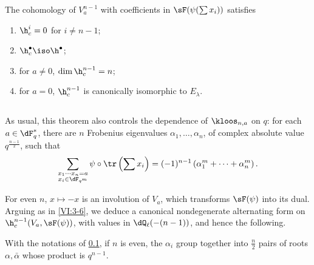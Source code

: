 \begin{theorem_}\label{VI:7-4}
The cohomology of $V_a^{n-1}$ with coefficients in $\sF(\psi(\sum x_i))$ satisfies 
\begin{enumerate}[\indent (i)]
  \item $\h_c^i=0$ for $i\ne n-1$; 
  \item $\h_c^\bullet{} \iso \h^\bullet{}$; 
  \item for $a\ne 0$, $\dim \h_c^{n-1}{}=n$; 
  
\item {}for $a=0$, $\h_c^{n-1}{}$ is canonically isomorphic to $E_\lambda$. 
\end{enumerate}
\end{theorem_}





\subsection{}\label{VI:7-5}

As usual, this theorem also controls the dependence of 
$\kloos_{n,a}$ on $q$: for each $a\in \dF_q^\ast$, there are $n$ Frobenius 
eigenvalues $\alpha_1,\dots,\alpha_n$, of complex absolute value 
$q^{\frac{n-1}{2}}$, such that 
\[
  \sum_{\substack{x_1\dotsm x_n = a \\ x_i\in \dF_{q^m}}} \psi\circ \tr\left(\sum x_i\right) = (-1)^{n-1} \left(\alpha_1^m + \cdots + \alpha_n^m \right) \text{.} 
\]

For even $n$, $x\mapsto -x$ is an involution of $V_a$, which transforms 
$\sF(\psi)$ into its dual. Arguing as in \ref{VI:3-6}, we deduce a 
canonical nondegenerate alternating form on $\h_c^{n-1}(V_a,\sF(\psi))$, 
with values in $\dQ_\ell(-(n-1))$, and hence the following. 





\begin{corollary_}\label{VI:7-6}
With the notations of \ref{VI:7-5}, if $n$ is even, the $\alpha_i$ group together 
into $\frac n 2$ pairs of roots $\alpha,\bar\alpha$ whose product is 
$q^{n-1}$. 
\end{corollary_}





\subsection{}\label{VI:7-7}

